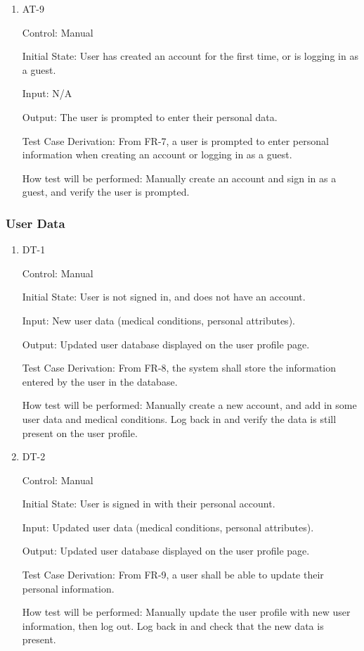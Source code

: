 \documentclass[12pt, titlepage]{article}
\begin{document}
\begin{enumerate}
\item{AT-9\\}

Control: Manual
					
Initial State: User has created an account for the first time, or is logging in as a guest.
					
Input: N/A
					
Output: The user is prompted to enter their personal data.

Test Case Derivation: From FR-7, a user is prompted to enter personal information when creating an account or logging in as a guest.

How test will be performed: Manually create an account and sign in as a guest, and verify the user is prompted.

\end{enumerate}

\subsubsection{User Data}

\begin{enumerate}

\item{DT-1\\}

Control: Manual
					
Initial State: User is not signed in, and does not have an account.
					
Input: New user data (medical conditions, personal attributes).
					
Output: Updated user database displayed on the user profile page.
	
Test Case Derivation: From FR-8, the system shall store the information entered by the user in the database.

How test will be performed: Manually create a new account, and add in some user data and medical conditions. Log back in and verify the data is still present on the user profile.


\item{DT-2\\}

Control: Manual
					
Initial State: User is signed in with their personal account.
					
Input: Updated user data (medical conditions, personal attributes).
					
Output: Updated user database displayed on the user profile page.

Test Case Derivation: From FR-9, a user shall be able to update their personal information.

How test will be performed: Manually update the user profile with new user information, then log out. Log back in and check that the new data is present.

\end{enumerate}
\end{document}
